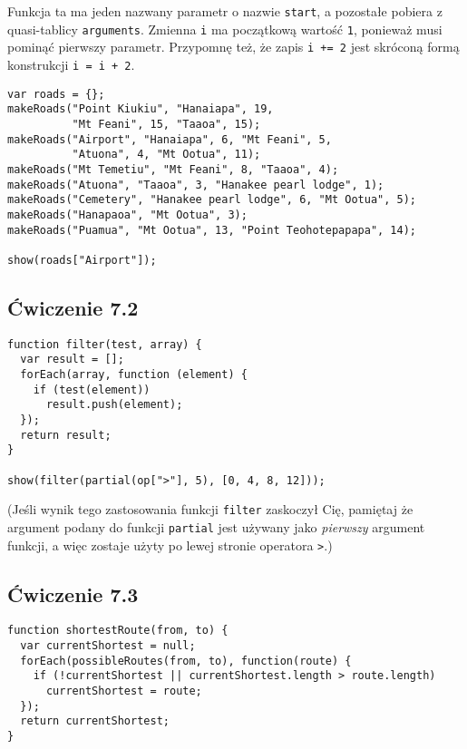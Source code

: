 Funkcja ta ma jeden nazwany parametr o nazwie \texttt{start}, a pozostałe pobiera z quasi-tablicy \texttt{arguments}. Zmienna \texttt{i} ma początkową wartość \texttt{1}, ponieważ musi pominąć pierwszy parametr. Przypomnę też, że zapis \texttt{i += 2} jest skróconą formą konstrukcji \texttt{i = i + 2}.
    
\begin{verbatim} 
var roads = {};
makeRoads("Point Kiukiu", "Hanaiapa", 19,
          "Mt Feani", 15, "Taaoa", 15);
makeRoads("Airport", "Hanaiapa", 6, "Mt Feani", 5,
          "Atuona", 4, "Mt Ootua", 11);
makeRoads("Mt Temetiu", "Mt Feani", 8, "Taaoa", 4);
makeRoads("Atuona", "Taaoa", 3, "Hanakee pearl lodge", 1);
makeRoads("Cemetery", "Hanakee pearl lodge", 6, "Mt Ootua", 5);
makeRoads("Hanapaoa", "Mt Ootua", 3);
makeRoads("Puamua", "Mt Ootua", 13, "Point Teohotepapapa", 14);

show(roads["Airport"]);
\end{verbatim}

  
\subsection*{Ćwiczenie 7.2}
\label{sol:7.2}
    
\begin{verbatim} 
function filter(test, array) {
  var result = [];
  forEach(array, function (element) {
    if (test(element))
      result.push(element);
  });
  return result;
}

show(filter(partial(op[">"], 5), [0, 4, 8, 12]));
 \end{verbatim}
    
(Jeśli wynik tego zastosowania funkcji \texttt{filter} zaskoczył Cię, pamiętaj że argument podany do funkcji \texttt{partial} jest używany jako \emph{pierwszy} argument funkcji, a więc zostaje użyty po lewej stronie operatora \texttt{>}.)

  
\subsection*{Ćwiczenie 7.3}
\label{sol:7.3}
    
\begin{verbatim} 
function shortestRoute(from, to) {
  var currentShortest = null;
  forEach(possibleRoutes(from, to), function(route) {
    if (!currentShortest || currentShortest.length > route.length)
      currentShortest = route;
  });
  return currentShortest;
}
\end{verbatim}
    
